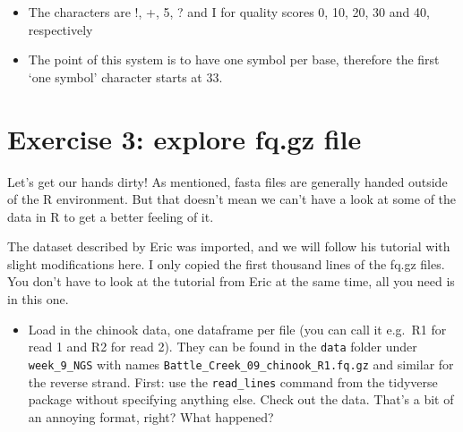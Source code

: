 \documentclass[
  letterpaper,
  DIV=11,
  numbers=noendperiod]{scrreprt}
\providecommand{\tightlist}{%
  \setlength{\itemsep}{0pt}\setlength{\parskip}{0pt}}\usepackage{longtable,booktabs,array}
\begin{document}
\begin{tcolorbox}[enhanced jigsaw, arc=.35mm, left=2mm, titlerule=0mm, rightrule=.15mm, colframe=quarto-callout-tip-color-frame, coltitle=black, colback=white, opacityback=0, bottomtitle=1mm, bottomrule=.15mm, colbacktitle=quarto-callout-tip-color!10!white, breakable, title=\textcolor{quarto-callout-tip-color}{\faLightbulb}\hspace{0.5em}{Answer}, toptitle=1mm, toprule=.15mm, opacitybacktitle=0.6, leftrule=.75mm]

\begin{itemize}
\item
  The characters are !, +, 5, ? and I for quality scores 0, 10, 20, 30
  and 40, respectively
\item
  The point of this system is to have one symbol per base, therefore the
  first `one symbol' character starts at 33.
\end{itemize}

\end{tcolorbox}

\section{Exercise 3: explore fq.gz
file}\label{exercise-3-explore-fq.gz-file}

Let's get our hands dirty! As mentioned, fasta files are generally
handed outside of the R environment. But that doesn't mean we can't have
a look at some of the data in R to get a better feeling of it.

The dataset described by Eric was imported, and we will follow his
tutorial with slight modifications here. I only copied the first
thousand lines of the fq.gz files. You don't have to look at the
tutorial from Eric at the same time, all you need is in this one.

\begin{itemize}
\tightlist
\item
  Load in the chinook data, one dataframe per file (you can call it
  e.g.~R1 for read 1 and R2 for read 2). They can be found in the
  \texttt{data} folder under \texttt{week\_9\_NGS} with names
  \texttt{Battle\_Creek\_09\_chinook\_R1.fq.gz} and similar for the
  reverse strand. First: use the \texttt{read\_lines} command from the
  tidyverse package without specifying anything else. Check out the
  data. That's a bit of an annoying format, right? What happened?
\end{itemize}
\end{document}
